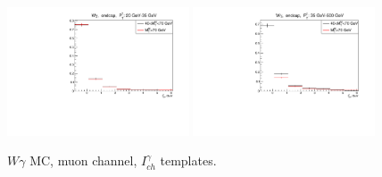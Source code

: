 \begin{figure}[htb]
\begin{center}
  \includegraphics[width=0.48\textwidth]{../figs/figs_v11/MUON_WGamma/QuickChecks/cTemplatesVsWMt_Wg_phoPFChIsoCorr_ENDCAP_pt20to35.pdf} \includegraphics[width=0.48\textwidth]{../figs/figs_v11/MUON_WGamma/QuickChecks/cTemplatesVsWMt_Wg_phoPFChIsoCorr_ENDCAP_pt35to500.pdf}\\
  \caption{$W\gamma$ MC, muon channel, $I_{ch}^{\gamma}$ templates.}
  \label{fig:templatesVsWMt_Wg_CHISO}
  \end{center}
\end{figure}

